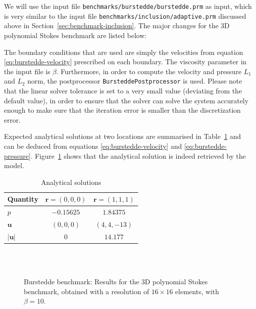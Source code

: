 \documentclass{article}
\begin{document}
We will use the input file \texttt{benchmarks/burstedde/burstedde.prm} as
input, which is very similar to the input file
\texttt{benchmarks/inclusion/adaptive.prm} discussed above in
Section~\ref{sec:benchmark-inclusion}. The major changes for the 3D polynomial
Stokes benchmark are listed below: 



The boundary conditions that are used are simply the velocities from equation
\eqref{eq:burstedde-velocity} prescribed on each boundary. The viscosity parameter in the input
file is $\beta$. Furthermore, in order to compute the velocity and pressure
$L_1$ and $L_2$ norm, the postprocessor \texttt{BursteddePostprocessor} is
used. Please note that the linear solver tolerance is set to a very small
value (deviating from the default value), in order to ensure that the solver
can solve the system accurately enough to make sure that the iteration
error is smaller than the discretization error.

Expected analytical solutions at two locations are summarised in Table~\ref{tab:burstedde-table} and can be deduced from equations \eqref{eq:burstedde-velocity} and
\eqref{eq:burstedde-pressure}.
Figure~\ref{fig:burstedde-benchmark} shows that the analytical solution is indeed retrieved by the model.

\begin{table}[h!]
\caption{Analytical solutions \label{tab:burstedde-table}}
\centering
\begin{tabular}{l|c|c}
Quantity & $\mathbf{r} = (0,0,0)$ & $\mathbf{r} = (1,1,1)$ \\ \hline
$p$ & $-0.15625$ & $1.84375$ \\
$\mathbf{u}$ & $(0,0,0)$  & $(4,4,-13)$ \\ 
$|\mathbf{u}|$ & $0$ &  $14.177$ \\
\end{tabular}
\end{table}

\begin{figure}[t!]
  \centering
  ~ 
  \\
  ~
  \caption{Burstedde benchmark: Results for the 3D polynomial Stokes benchmark, obtained with a resolution of $16\times 16$ elements, with $\beta = 10$.}\label{fig:burstedde-benchmark}
\end{figure}
\end{document}
